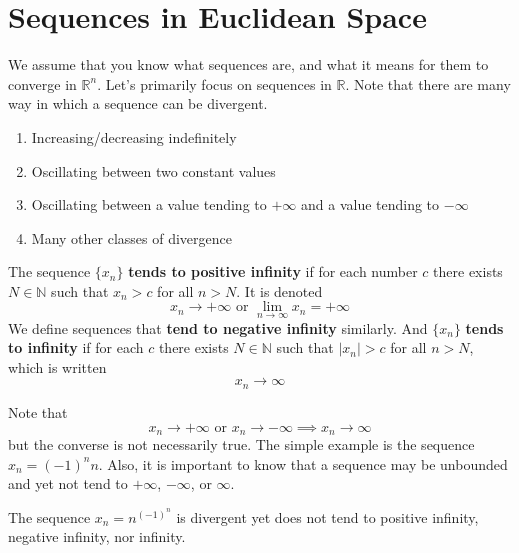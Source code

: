 \section{Sequences in Euclidean Space} 

  We assume that you know what sequences are, and what it means for them to converge in $\mathbb{R}^n$. Let's primarily focus on sequences in $\mathbb{R}$. Note that there are many way in which a sequence can be divergent. 
  \begin{enumerate}
    \item Increasing/decreasing indefinitely
    \item Oscillating between two constant values
    \item Oscillating between a value tending to $+\infty$ and a value tending to $-\infty$
    \item Many other classes of divergence
  \end{enumerate}

  \begin{definition}
    The sequence $\{x_n\}$ \textbf{tends to positive infinity} if for each number $c$ there exists $N \in \mathbb{N}$ such that $x_n > c$ for all $n > N$. It is denoted 
    \begin{equation}
      x_n \rightarrow + \infty \text{ or } \lim_{n \rightarrow \infty} x_n = + \infty
    \end{equation}
    We define sequences that \textbf{tend to negative infinity} similarly. And $\{x_n\}$ \textbf{tends to infinity} if for each $c$ there exists $N \in \mathbb{N}$ such that $|x_n| > c$ for all $n > N$, which is written 
    \begin{equation}
      x_n \rightarrow \infty
    \end{equation}
  \end{definition}

  Note that 
  \begin{equation}
    x_n \rightarrow +\infty \text{ or } x_n \rightarrow -\infty \implies x_n \rightarrow \infty
  \end{equation}
  but the converse is not necessarily true. The simple example is the sequence $x_n = (-1)^n n$. Also, it is important to know that a sequence may be unbounded and yet not tend to $+\infty$, $-\infty$, or $\infty$. 

  \begin{example}
    The sequence $x_n = n^{(-1)^n}$ is divergent yet does not tend to positive infinity, negative infinity, nor infinity. 
  \end{example} 

